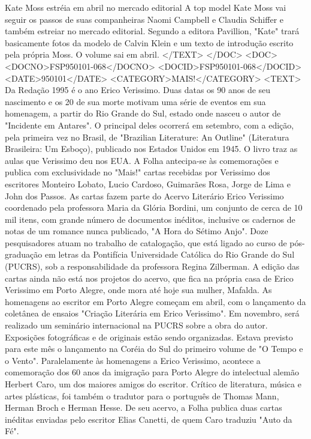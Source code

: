 Kate Moss estréia em abril no mercado editorial 
A top model Kate Moss vai seguir os passos de suas companheiras Naomi Campbell e Claudia Schiffer e também estreiar no mercado editorial. Segundo a editora Pavillion, "Kate" trará basicamente fotos da modelo de Calvin Klein e um texto de introdução escrito pela própria Moss. O volume sai em abril.
</TEXT>
</DOC>
<DOC>
<DOCNO>FSP950101-068</DOCNO>
<DOCID>FSP950101-068</DOCID>
<DATE>950101</DATE>
<CATEGORY>MAIS!</CATEGORY>
<TEXT>
Da Redação 
1995 é o ano Erico Verissimo. Duas datas os 90 anos de seu nascimento e os 20 de sua morte motivam uma série de eventos em sua homenagem, a partir do Rio Grande do Sul, estado onde nasceu o autor de "Incidente em Antares".
O principal deles ocorrerá em setembro, com a edição, pela primeira vez no Brasil, de "Brazilian Literature: An Outline" (Literatura Brasileira: Um Esboço), publicado nos Estados Unidos em 1945. O livro traz as aulas que Verissimo deu nos EUA.
A Folha antecipa-se às comemorações e publica com exclusividade no "Mais!" cartas recebidas por Verissimo dos escritores Monteiro Lobato, Lucio Cardoso, Guimarães Rosa, Jorge de Lima e John dos Passos.
As cartas fazem parte do Acervo Literário Erico Verissimo coordenado pela professora Maria da Glória Bordini, um conjunto de cerca de 10 mil itens, com grande número de documentos inéditos, inclusive os cadernos de notas de um romance nunca publicado, "A Hora do Sétimo Anjo". Doze pesquisadores atuam no trabalho de catalogação, que está ligado ao curso de pós-graduação em letras da Pontifícia Universidade Católica do Rio Grande do Sul (PUCRS), sob a responsabilidade da professora Regina Zilberman.
A edição das cartas ainda não está nos projetos do acervo, que fica na própria casa de Erico Verissimo em Porto Alegre, onde mora até hoje sua mulher, Mafalda.
As homenagens ao escritor em Porto Alegre começam em abril, com o lançamento da coletânea de ensaios "Criação Literária em Erico Verissimo". Em novembro, será realizado um seminário internacional na PUCRS sobre a obra do autor. Exposições fotográficas e de originais estão sendo organizadas. Estava previsto para este mês o lançamento na Coréia do Sul do primeiro volume de "O Tempo e o Vento".
Paralelamente às homenagens a Erico Verissimo, acontece a comemoração dos 60 anos da imigração para Porto Alegre do intelectual alemão Herbert Caro, um dos maiores amigos do escritor. Crítico de literatura, música e artes plásticas, foi também o tradutor para o português de Thomas Mann, Herman Broch e Herman Hesse. De seu acervo, a Folha publica duas cartas inéditas enviadas pelo escritor Elias Canetti, de quem Caro traduziu "Auto da Fé".
